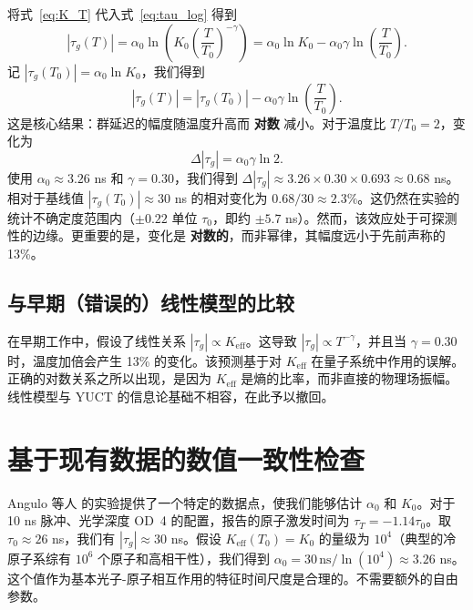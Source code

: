 \documentclass[12pt,a4paper]{article}
\newcommand{\Keff}{K_{\mathrm{eff}}}
\begin{document}
	将式~\eqref{eq:K_T} 代入式~\eqref{eq:tau_log} 得到
	\begin{equation}
		|\tau_g(T)| = \alpha_0 \ln\!\left(K_0 \left(\frac{T}{T_0}\right)^{-\gamma}\right)
		= \alpha_0 \ln K_0 - \alpha_0 \gamma \ln\!\left(\frac{T}{T_0}\right).
	\end{equation}
	记 \(|\tau_g(T_0)| = \alpha_0 \ln K_0\)，我们得到
	\begin{equation}
		|\tau_g(T)| = |\tau_g(T_0)| - \alpha_0 \gamma \ln\!\left(\frac{T}{T_0}\right).
		\label{eq:tau_T_log}
	\end{equation}
	这是核心结果：群延迟的幅度随温度升高而 \textbf{对数} 减小。对于温度比 \(T/T_0 = 2\)，变化为
	\begin{equation}
		\Delta |\tau_g| = \alpha_0 \gamma \ln 2.
	\end{equation}
	使用 \(\alpha_0 \approx 3.26\) ns 和 \(\gamma = 0.30\)，我们得到 \(\Delta |\tau_g| \approx 3.26 \times 0.30 \times 0.693 \approx 0.68\) ns。相对于基线值 \(|\tau_g(T_0)| \approx 30\) ns 的相对变化为 \(0.68 / 30 \approx 2.3\%\)。这仍然在实验的统计不确定度范围内（\(\pm 0.22\) 单位 \(\tau_0\)，即约 \(\pm 5.7\) ns）。然而，该效应处于可探测性的边缘。更重要的是，变化是 \textbf{对数的}，而非幂律，其幅度远小于先前声称的 13\%。
	
	\subsection{与早期（错误的）线性模型的比较}
	
	在早期工作中，假设了线性关系 \(|\tau_g| \propto \Keff\)。这导致 \(|\tau_g| \propto T^{-\gamma}\)，并且当 \(\gamma = 0.30\) 时，温度加倍会产生 13\% 的变化。该预测基于对 \(\Keff\) 在量子系统中作用的误解。正确的对数关系之所以出现，是因为 \(\Keff\) 是熵的比率，而非直接的物理场振幅。线性模型与 YUCT 的信息论基础不相容，在此予以撤回。
	
	\section{基于现有数据的数值一致性检查}
	
	Angulo 等人 \cite{Angulo2024} 的实验提供了一个特定的数据点，使我们能够估计 \(\alpha_0\) 和 \(K_0\)。对于 10 ns 脉冲、光学深度 OD~4 的配置，报告的原子激发时间为 \(\tau_T = -1.14 \tau_0\)。取 \(\tau_0 \approx 26\) ns，我们有 \(|\tau_g| \approx 30\) ns。假设 \(\Keff(T_0) = K_0\) 的量级为 \(10^4\)（典型的冷原子系综有 \(10^6\) 个原子和高相干性），我们得到 \(\alpha_0 = 30\,\text{ns} / \ln(10^4) \approx 3.26\) ns。这个值作为基本光子-原子相互作用的特征时间尺度是合理的。不需要额外的自由参数。
	
\end{document}

